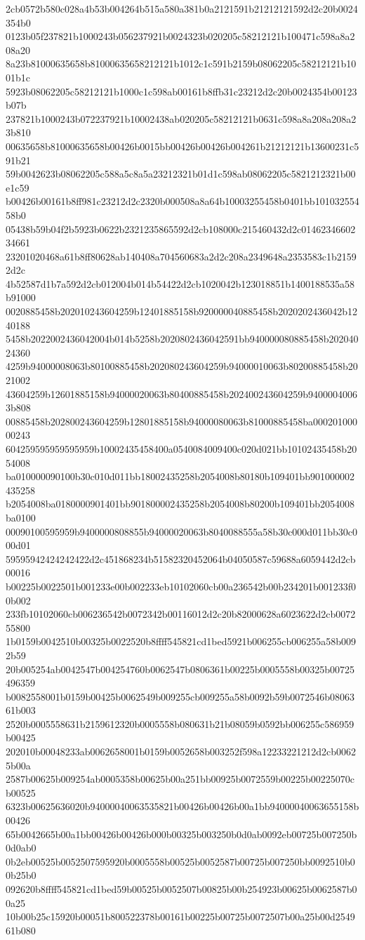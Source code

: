 2cb0572b580c028a4b53b004264b515a580a381b0a2121591b21212121592d2c20b0024354b0
0123b05f237821b1000243b056237921b0024323b020205c58212121b100471c598a8a208a20
8a23b81000635658b81000635658212121b1012c1c591b2159b08062205c58212121b1001b1c
5923b08062205c58212121b1000c1c598ab00161b8ffb31c23212d2c20b0024354b00123b07b
237821b1000243b072237921b10002438ab020205c58212121b0631c598a8a208a208a23b810
00635658b81000635658b00426b0015bb00426b00426b004261b21212121b13600231c591b21
59b0042623b08062205c588a5c8a5a23212321b01d1c598ab08062205c5821212321b00e1c59
b00426b00161b8ff981c23212d2c2320b000508a8a64b10003255458b0401bb10103255458b0
05438b59b04f2b5923b0622b2321235865592d2cb108000c215460432d2c0146234660234661
23201020468a61b8ff80628ab140408a704560683a2d2c208a2349648a2353583c1b21592d2c
4b52587d1b7a592d2cb012004b014b54422d2cb1020042b123018851b1400188535a58b91000
0020885458b202010243604259b12401885158b920000040885458b2020202436042b1240188
5458b2022002436042004b014b5258b2020802436042591bb940000080885458b20204024360
4259b94000008063b80100885458b202080243604259b94000010063b80200885458b2021002
43604259b12601885158b94000020063b80400885458b202400243604259b94000040063b808
00885458b202800243604259b12801885158b94000080063b81000885458ba00020100000243
604259595959595959b10002435458400a0540084009400c020d021bb10102435458b2054008
ba010000090100b30c010d011bb18002435258b2054008b80180b109401bb901000002435258
b2054008ba0180000901401bb901800002435258b2054008b80200b109401bb2054008ba0100
00090100595959b9400000808855b94000020063b8040088555a58b30c000d011bb30c000d01
59595942424242422d2c451868234b51582320452064b04050587c59688a6059442d2cb00016
b00225b0022501b001233e00b002233eb10102060cb00a236542b00b234201b001233f00b002
233fb10102060cb006236542b0072342b00116012d2c20b82000628a6023622d2cb007255800
1b0159b0042510b00325b0022520b8ffff545821cd1bed5921b006255cb006255a58b0092b59
20b005254ab0042547b004254760b0062547b0806361b00225b0005558b00325b00725496359
b0082558001b0159b00425b0062549b009255cb009255a58b0092b59b0072546b0806361b003
2520b0005558631b2159612320b0005558b080631b21b08059b0592bb006255c586959b00425
202010b00048233ab0062658001b0159b0052658b003252f598a12233221212d2cb00625b00a
2587b00625b009254ab0005358b00625b00a251bb00925b0072559b00225b00225070cb00525
6323b00625636020b94000040063535821b00426b00426b00a1bb94000040063655158b00426
65b0042665b00a1bb00426b00426b000b00325b003250b0d0ab0092eb00725b007250b0d0ab0
0b2eb00525b0052507595920b0005558b00525b0052587b00725b007250bb0092510b00b25b0
092620b8ffff545821cd1bed59b00525b0052507b00825b00b254923b00625b0062587b00a25
10b00b25c15920b00051b800522378b00161b00225b00725b0072507b00a25b00d254961b080
